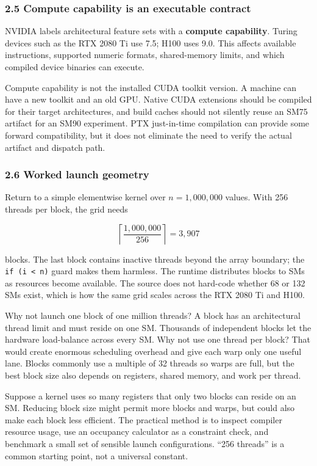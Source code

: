 \documentclass[
  10pt,
  letterpaper,
]{article}
\begin{document}
\subsubsection{2.5 Compute capability is an executable
contract}\label{25-compute-capability-is-an-executable-contract}

NVIDIA labels architectural feature sets with a \textbf{compute
capability}. Turing devices such as the RTX 2080 Ti use 7.5; H100 uses
9.0. This affects available instructions, supported numeric formats,
shared-memory limits, and which compiled device binaries can execute.

Compute capability is not the installed CUDA toolkit version. A machine
can have a new toolkit and an old GPU. Native CUDA extensions should be
compiled for their target architectures, and build caches should not
silently reuse an SM75 artifact for an SM90 experiment. PTX just-in-time
compilation can provide some forward compatibility, but it does not
eliminate the need to verify the actual artifact and dispatch path.

\subsubsection{2.6 Worked launch
geometry}\label{26-worked-launch-geometry}

Return to a simple elementwise kernel over \(n=1{,}000{,}000\) values.
With 256 threads per block, the grid needs

\[
\left\lceil\frac{1{,}000{,}000}{256}\right\rceil=3{,}907
\]

blocks. The last block contains inactive threads beyond the array
boundary; the \texttt{if\ (i\ \textless{}\ n)} guard makes them
harmless. The runtime distributes blocks to SMs as resources become
available. The source does not hard-code whether 68 or 132 SMs exist,
which is how the same grid scales across the RTX 2080 Ti and H100.

Why not launch one block of one million threads? A block has an
architectural thread limit and must reside on one SM. Thousands of
independent blocks let the hardware load-balance across every SM. Why
not use one thread per block? That would create enormous scheduling
overhead and give each warp only one useful lane. Blocks commonly use a
multiple of 32 threads so warps are full, but the best block size also
depends on registers, shared memory, and work per thread.

Suppose a kernel uses so many registers that only two blocks can reside
on an SM. Reducing block size might permit more blocks and warps, but
could also make each block less efficient. The practical method is to
inspect compiler resource usage, use an occupancy calculator as a
constraint check, and benchmark a small set of sensible launch
configurations. ``256 threads'' is a common starting point, not a
universal constant.
\end{document}
